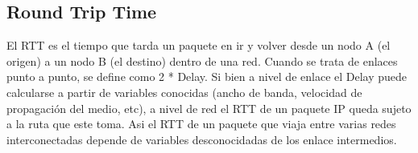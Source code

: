 \subsection {Round Trip Time}

El RTT es el tiempo que tarda un paquete en ir y volver desde un nodo A (el origen) a un nodo B (el destino) dentro de una red. 
Cuando se trata de enlaces punto a punto, se define como 2 * Delay. 
Si bien a nivel de enlace el Delay puede calcularse a partir de variables conocidas (ancho de banda, velocidad de propagación del medio, etc), a nivel de red el RTT de un paquete IP queda sujeto a la ruta que este toma.
Asi el RTT de un paquete que viaja entre varias redes interconectadas depende de variables desconocidadas de los enlace intermedios.
	
